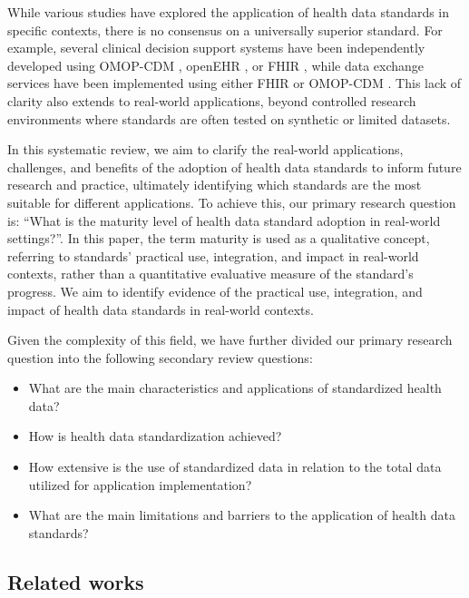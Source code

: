 While various studies have explored the application of health data standards in specific contexts, there is no consensus on a universally superior standard. For example, several clinical decision support systems have been independently developed using OMOP-CDM \cite{sadsad_computable_2023}, openEHR \cite{li_configurable_2022}, or FHIR \cite{ulgu_nationwide_2024}, while data exchange services have been implemented using either FHIR \cite{noauthor_fhir_gics_pubmed} or OMOP-CDM \cite{almeida_methodology_2021}. This lack of clarity also extends to real-world applications, beyond controlled research environments where standards are often tested on synthetic or limited datasets.

In this systematic review, we aim to clarify the real-world applications, challenges, and benefits of the adoption of health data standards to inform future research and practice, ultimately identifying which standards are the most suitable for different applications. To achieve this, our primary research question is: ``What is the maturity level of health data standard adoption in real-world settings?''. In this paper, the term maturity is used as a qualitative concept, referring to standards' practical use, integration, and impact in real-world contexts, rather than a quantitative evaluative measure of the standard's progress. We aim to identify evidence of the practical use, integration, and impact of health data standards in real-world contexts.

Given the complexity of this field, we have further divided our primary research question into the following secondary review questions:

\begin{itemize}
  \item[i)] What are the main characteristics and applications of standardized health data?
  \item[ii)] How is health data standardization achieved?
  \item[iii)] How extensive is the use of standardized data in relation to the total data utilized for application implementation?
  \item[iv)] What are the main limitations and barriers to the application of health data standards?
\end{itemize}

\subsection{Related works}
\label{sec:paper1_related_works}

